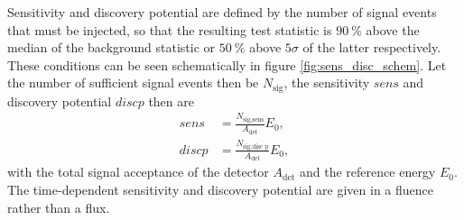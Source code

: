 Sensitivity and discovery potential are defined by the number of signal events that must be injected, so that the resulting test statistic is $\SI{90}{\percent}$ above the median of the background statistic or $\SI{50}{\percent}$ above $\num{5}\sigma$ of the latter respectively.
These conditions can be seen schematically in figure \ref{fig:sens_disc_schem}.
Let the number of sufficient signal events then be $N_\text{sig}$, the sensitivity $sens$ and discovery potential $disc p$ then are
\begin{align}
  sens &= \frac{N_\text{sig,sens}}{A_\text{det}}E_0, \\
  disc p &= \frac{N_\text{sig,disc p}}{A_\text{det}}E_0,
\end{align}
with the total signal acceptance of the detector $A_\text{det}$ and the reference energy $E_0$.
The time-dependent sensitivity and discovery potential are given in a fluence rather than a flux.%
